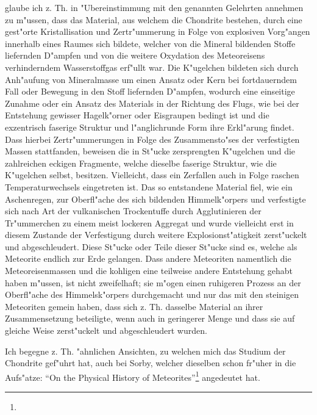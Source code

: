 \documentclass[a4paper, 11pt, oneside]{article}
\begin{document}
glaube ich z. Th. in "Ubereinstimmung mit den genannten Gelehrten annehmen zu m"ussen, dass das Material, aus welchem die Chondrite bestehen, durch eine gest"orte Kristallisation und Zertr"ummerung in Folge von explosiven Vorg"angen innerhalb eines Raumes sich bildete, welcher von die Mineral bildenden Stoffe liefernden D"ampfen und von die weitere Oxydation des Meteoreisens verhinderndem Wasserstoffgas erf"ullt war. Die K"ugelchen bildeten sich durch Anh"aufung von Mineralmasse um einen Ansatz oder Kern bei fortdauerndem Fall oder Bewegung in den Stoff liefernden D"ampfen, wodurch eine einseitige Zunahme oder ein Ansatz des Materials in der Richtung des Flugs, wie bei der Entstehung gewisser Hagelk"orner oder Eisgraupen bedingt ist und die exzentrisch faserige Struktur und l"anglichrunde Form ihre Erkl"arung findet. Dass hierbei Zertr"ummerungen in Folge des Zusammensto"ses der verfestigten Massen stattfanden, beweisen die in St"ucke zersprengten K"ugelchen und die zahlreichen eckigen Fragmente, welche dieselbe faserige Struktur, wie die K"ugelchen selbst, besitzen. Vielleicht, dass ein Zerfallen auch in Folge raschen Temperaturwechsels eingetreten ist. Das so entstandene Material fiel, wie ein Aschenregen, zur Oberfl"ache des sich bildenden Himmelk"orpers und verfestigte sich nach Art der vulkanischen Trockentuffe durch Agglutinieren der Tr"ummerchen zu einem meist lockeren Aggregat und wurde vielleicht erst in diesem Zustande der Verfestigung durch weitere Explosionst"atigkeit zerst"uckelt und abgeschleudert. Diese St"ucke oder Teile dieser St"ucke sind es, welche als Meteorite endlich zur Erde gelangen. Dass andere Meteoriten namentlich die Meteoreisenmassen und die kohligen eine teilweise andere Entstehung gehabt haben m"ussen, ist nicht zweifelhaft; sie m"ogen einen ruhigeren Prozess an der Oberfl"ache des Himmelsk"orpers durchgemacht und nur das mit den steinigen Meteoriten gemein haben, dass sich z. Th. dasselbe Material an ihrer Zusammensetzung beteiligte, wenn auch in geringerer Menge und dass sie auf gleiche Weise zerst"uckelt und abgeschleudert wurden.

Ich begegne z. Th. "ahnlichen Ansichten, zu welchen mich das Studium der Chondrite gef"uhrt hat, auch bei Sorby, welcher dieselben schon fr"uher in die Aufs"atze: "`On the Physical History of Meteorites"'\footnote{} angedeutet hat.
\end{document}
